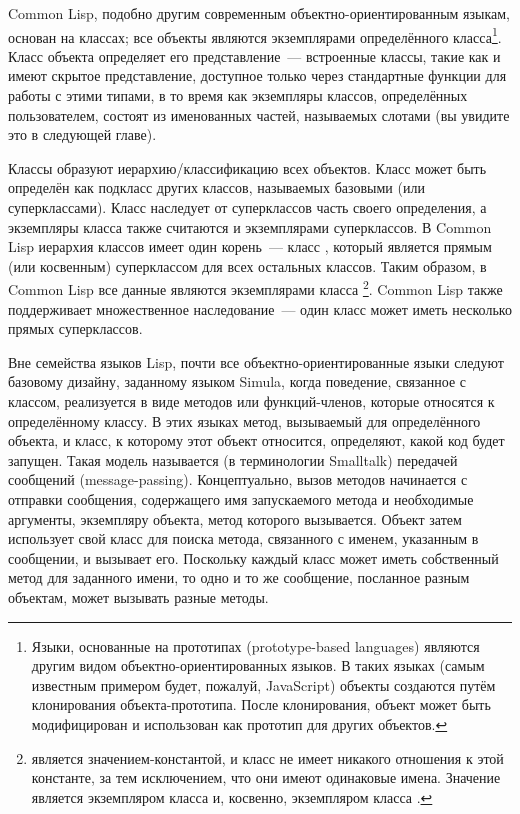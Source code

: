 Common Lisp, подобно другим современным объектно-ориентированным языкам, основан на
классах; все объекты являются экземплярами определённого класса\footnote{Языки, основанные
  на прототипах (prototype-based languages) являются другим видом объектно-ориентированных
  языков. В таких языках (самым известным примером будет, пожалуй, JavaScript) объекты
  создаются путём клонирования объекта-прототипа. После клонирования, объект может быть
  модифицирован и использован как прототип для других объектов.}.  Класс объекта
определяет его представление~--- встроенные классы, такие как  и 
имеют скрытое представление, доступное только через стандартные функции для работы с этими
типами, в то время как экземпляры классов, определённых пользователем, состоят из
именованных частей, называемых слотами (вы увидите это в следующей главе).

Классы образуют иерархию/классификацию всех объектов.  Класс может быть определён как
подкласс других классов, называемых базовыми (или суперклассами).  Класс наследует от
суперклассов часть своего определения, а экземпляры класса также считаются и экземплярами
суперклассов.  В Common Lisp иерархия классов имеет один корень~--- класс , который
является прямым (или косвенным) суперклассом для всех остальных классов.  Таким образом, в
Common Lisp все данные являются экземплярами класса \footnote{ является
  значением-константой, и класс  не имеет никакого отношения к этой константе, за
  тем исключением, что они имеют одинаковые имена.  Значение  является экземпляром
  класса  и, косвенно, экземпляром класса .}.  Common Lisp также
поддерживает множественное наследование~--- один класс может иметь несколько прямых
суперклассов.

Вне семейства языков Lisp, почти все объектно-ориентированные языки следуют базовому
дизайну, заданному языком Simula, когда поведение, связанное с классом, реализуется в виде
методов или функций-членов, которые относятся к определённому классу.  В этих языках
метод, вызываемый для определённого объекта, и класс, к которому этот объект относится,
определяют, какой код будет запущен.  Такая модель называется (в терминологии Smalltalk)
передачей сообщений (message-passing).  Концептуально, вызов методов начинается с отправки
сообщения, содержащего имя запускаемого метода и необходимые аргументы, экземпляру
объекта, метод которого вызывается.  Объект затем использует свой класс для поиска метода,
связанного с именем, указанным в сообщении, и вызывает его.  Поскольку каждый класс может
иметь собственный метод для заданного имени, то одно и то же сообщение, посланное разным
объектам, может вызывать разные методы.

